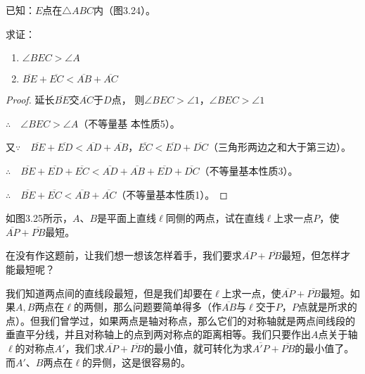 \begin{example}
    已知：$E$点在$\triangle ABC$内（图3.24）。

求证： \begin{enumerate}
    \item $\angle BEC>\angle A$
    \item $\overline{BE}+\overline{EC}<\overline{AB}+\overline{AC}$
\end{enumerate} 
\end{example}

\begin{proof}
    延长$\overline{BE}$交$\overline{AC}$于$D$点，
则$\angle BEC>\angle 1$，$\angle BEC>\angle 1$

$\therefore\quad \angle BEC>\angle A$（不等量基
本性质5）。

又$\because\quad \overline{BE}+\overline{ED}<\overline{AD}+\overline{AB}$，$\overline{EC}<\overline{ED}+\overline{DC}$（三角形两边之和大于第三边）。

$\therefore\quad \overline{BE}+\overline{ED}+\overline{EC}<\overline{AD}+\overline{AB}+\overline{ED}+\overline{DC}$（不等量基本性质3）。

$\therefore\quad \overline{BE}+\overline{EC}<\overline{AB}+\overline{AC}$（不等量基本性质1）。
\end{proof}

\begin{example}
如图3.25所示，$A$、$B$是平面上直线$\ell$同侧的两点，试在直线$\ell$上求一点$P$，使$\overline{AP}+\overline{PB}$最短。

在没有作这题前，让我们想一想该怎样着手，我们要求$\overline{AP}+\overline{PB}$最短，但怎样才能最短呢？

我们知道两点间的直线段最短，但是我们却要在$\ell$上求一点，使$\overline{AP}+\overline{PB}$最短。如果$A,B$两点在$\ell$的两侧，那么问题要简单得多（作$\overline{AB}$与$\ell$交于$P$，$P$点就是所求的点）。但我们曾学过，如果两点是轴对称点，那么它们的对称轴就是两点间线段的垂直平分线，并且对称轴上的点到两对称点的距离相等。我们只要作出$A$点关于轴$\ell$的对称点$A'$，我们求$\overline{AP}+\overline{PB}$的最小值，就可转化为求$\overline{A'P}+\overline{PB}$的最小值了。而$A'$、$B$两点在$\ell$的异侧，这是很容易的。

\begin{figure}
    \caption{}
\end{figure}
\end{example}


